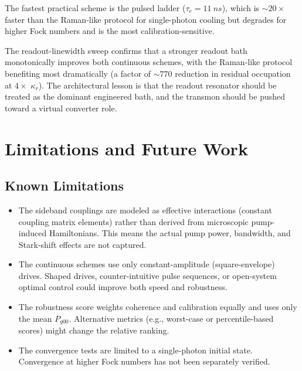 \documentclass[aps,pra,twocolumn,reprint,floatfix,amsmath,amssymb]{revtex4-2}
\begin{document}
The fastest practical scheme is the pulsed ladder ($\tau_e = \SI{11}{ns}$), which is ${\sim}20\times$ faster than the Raman-like protocol for single-photon cooling but degrades for higher Fock numbers and is the most calibration-sensitive.

The readout-linewidth sweep confirms that a stronger readout bath monotonically improves both continuous schemes, with the Raman-like protocol benefiting most dramatically (a factor of ${\sim}770$ reduction in residual occupation at $4\times$ $\kappa_r$).
The architectural lesson is that the readout resonator should be treated as the dominant engineered bath, and the transmon should be pushed toward a virtual converter role.

\section{Limitations and Future Work}
\label{sec:limitations}

\subsection{Known Limitations}

\begin{itemize}
\item The sideband couplings are modeled as effective interactions (constant coupling matrix elements) rather than derived from microscopic pump-induced Hamiltonians.
This means the actual pump power, bandwidth, and Stark-shift effects are not captured.

\item The continuous schemes use only constant-amplitude (square-envelope) drives.
Shaped drives, counter-intuitive pulse sequences, or open-system optimal control could improve both speed and robustness.

\item The robustness score weights coherence and calibration equally and uses only the mean $P_{g00}$.
Alternative metrics (e.g., worst-case or percentile-based scores) might change the relative ranking.

\item The convergence tests are limited to a single-photon initial state.
Convergence at higher Fock numbers has not been separately verified.
\end{itemize}
\end{document}

